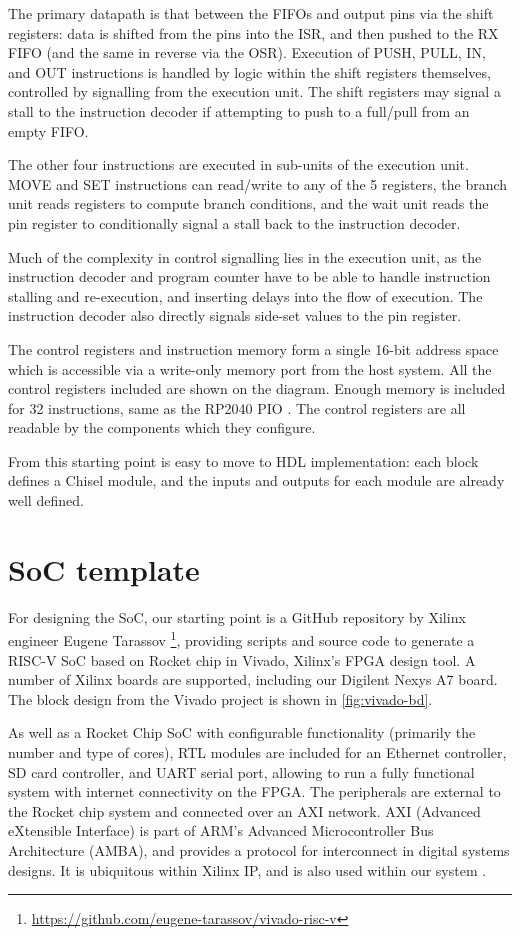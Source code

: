 The primary datapath is that between the FIFOs and output pins via the shift registers: data is shifted from the pins into the ISR, and then pushed to the RX FIFO (and the same in reverse via the OSR). Execution of PUSH, PULL, IN, and OUT instructions is handled by logic within the shift registers themselves, controlled by signalling from the execution unit. The shift registers may signal a stall to the instruction decoder if attempting to push to a full/pull from an empty FIFO.

The other four instructions are executed in sub-units of the execution unit. MOVE and SET instructions can read/write to any of the 5 registers, the branch unit reads registers to compute branch conditions, and the wait unit reads the pin register to conditionally signal a stall back to the instruction decoder.

Much of the complexity in control signalling lies in the execution unit, as the instruction decoder and program counter have to be able to handle instruction stalling and re-execution, and inserting delays into the flow of execution. The instruction decoder also directly signals side-set values to the pin register.

The control registers and instruction memory form a single 16-bit address space which is accessible via a write-only memory port from the host system. All the control registers included are shown on the diagram. Enough memory is included for 32 instructions, same as the RP2040 PIO \cite{rp2040}. The control registers are all readable by the components which they configure.

From this starting point is easy to move to HDL implementation: each block defines a Chisel module, and the inputs and outputs for each module are already well defined.

\section{SoC template}

For designing the SoC, our starting point is a GitHub repository by Xilinx  engineer Eugene Tarassov \footnote{\url{https://github.com/eugene-tarassov/vivado-risc-v}}, providing scripts and source code to generate a RISC-V SoC based on Rocket chip in Vivado, Xilinx's FPGA design tool. A number of Xilinx boards are supported, including our Digilent Nexys A7 board. The block design from the Vivado project is shown in  \ref{fig:vivado-bd}.

As well as a Rocket Chip SoC with configurable functionality (primarily the number and type of cores), RTL modules are included for an Ethernet controller, SD card controller, and UART serial port, allowing to run a fully functional system with internet connectivity on the FPGA. The peripherals are external to the Rocket chip system and connected over an AXI network. AXI (Advanced eXtensible Interface) is part of ARM's Advanced Microcontroller Bus Architecture (AMBA), and provides a protocol for interconnect in digital systems designs. It is ubiquitous within Xilinx IP, and is also used within our system \cite{axi}.

